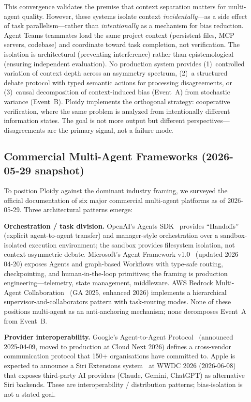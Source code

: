 \documentclass[11pt]{article}
\begin{document}
This convergence validates the premise that context separation matters for multi-agent quality. However, these systems isolate context \emph{incidentally}---as a side effect of task parallelism---rather than \emph{intentionally} as a mechanism for bias reduction. Agent Teams teammates load the same project context (persistent files, MCP servers, codebase) and coordinate toward task completion, not verification. The isolation is architectural (preventing interference) rather than epistemological (ensuring independent evaluation). No production system provides (1)~controlled variation of context depth across an asymmetry spectrum, (2)~a structured debate protocol with typed semantic actions for processing disagreements, or (3)~causal decomposition of context-induced bias (Event~A) from stochastic variance (Event~B). Ploidy implements the orthogonal strategy: cooperative verification, where the same problem is analyzed from intentionally different information states. The goal is not more output but different perspectives---disagreements are the primary signal, not a failure mode.

\subsection{Commercial Multi-Agent Frameworks (2026-05-29 snapshot)}
\label{sec:industry}

To position Ploidy against the dominant industry framing, we
surveyed the official documentation of six major commercial
multi-agent platforms as of 2026-05-29. Three architectural
patterns emerge:

\textbf{Orchestration / task division.} OpenAI's Agents
SDK~\citep{openai2026agentsdk} provides ``Handoffs'' (explicit
agent-to-agent transfer) and manager-style orchestration over a
sandbox-isolated execution environment; the
sandbox provides filesystem isolation, not
context-asymmetric debate. Microsoft's Agent Framework
v1.0~\citep{microsoft2026agentframework} (updated 2026-04-20)
exposes Agents and graph-based Workflows with type-safe routing,
checkpointing, and human-in-the-loop primitives; the framing is
production engineering---telemetry, state management,
middleware. AWS Bedrock Multi-Agent
Collaboration~\citep{aws2026bedrockmultiagent} (GA 2025, enhanced
2026) implements a hierarchical supervisor-and-collaborators
pattern with task-routing modes. None of these positions
multi-agent as an anti-anchoring mechanism; none decomposes
Event~A from Event~B.

\textbf{Provider interoperability.} Google's Agent-to-Agent
Protocol~\citep{google2025a2a} (announced 2025-04-09, moved to
production at Cloud Next 2026) defines a cross-vendor
communication protocol that 150+ organisations have committed
to. Apple is expected to announce a Siri Extensions
system~\citep{wwdc2026preview} at WWDC 2026 (2026-06-08) that
exposes third-party AI providers (Claude, Gemini, ChatGPT) as
alternative Siri backends. These are interoperability /
distribution patterns; bias-isolation is not a stated goal.
\end{document}
